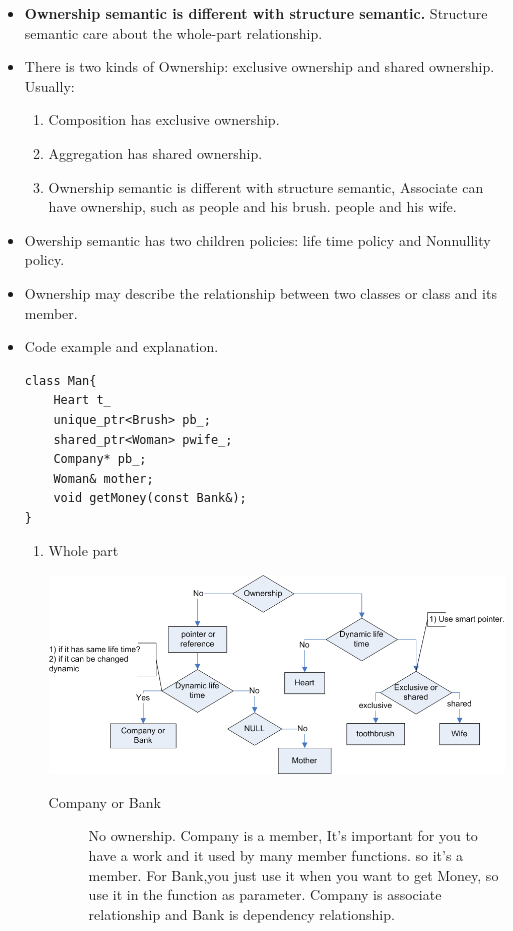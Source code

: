 \documentclass[a4paper,11pt,twoside]{book}
\begin{document}
\begin{itemize}
	\item \textbf{Ownership semantic is different with structure semantic.} Structure semantic care about the whole-part relationship.
	
	\item There is two kinds of Ownership: exclusive ownership and shared ownership. Usually:
	\begin{enumerate}
		\item Composition has exclusive ownership.
		\item Aggregation has shared ownership.
		\item Ownership semantic is different with structure semantic, Associate can have ownership, such as people and his brush. people and his wife.
	\end{enumerate}
	
	\item Owership semantic has two children policies: life time policy and Nonnullity policy. 
	
	\item Ownership may describe the relationship between two classes or class and its member.
	
	\item Code example and explanation. 
\begin{lstlisting}
class Man{
	Heart t_   
	unique_ptr<Brush> pb_; 
	shared_ptr<Woman> pwife_; 
	Company* pb_; 
	Woman& mother; 
	void getMoney(const Bank&);
}
\end{lstlisting}
\begin{enumerate}
\item Whole part

\begin{center}
		\includegraphics[width=0.92\linewidth]{pics/owner.png}
\end{center}


\begin{description}
	\item[Company or Bank] No ownership. Company is a member, It's important for you to have a work and it used by many member functions. so it's a member. For Bank,you just use it when you want to get Money, so use it in the function as parameter. Company is associate relationship and Bank is dependency relationship.
	

\end{description}
\end{enumerate}
\end{itemize}
\end{document}
